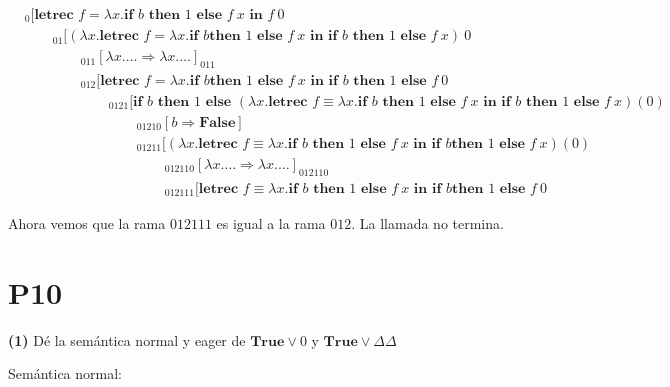 \documentclass[article, 12pt]{article}
\begin{document}
\begin{align*}
&_0[\textbf{letrec } f = \lambda x. 
\textbf{if } b \textbf{ then } 1 \textbf{    else } f ~ x \textbf{ in } f~0 \\ 
&\qquad _{01}[(\lambda x. \textbf{letrec } f = \lambda x.\textbf{if } b \textbf{
then } 1 \textbf{    else } f ~ x \textbf{ in }\textbf{if } b \textbf{ then } 1
\textbf{    else } f ~ x ) ~ 0 \\ 
&\qquad \qquad_{011}[\lambda x. \ldots \Rightarrow \lambda x. \ldots]_{011} \\ 
&\qquad \qquad _{012}[\textbf{letrec } f = \lambda x.\textbf{if } b \textbf{
then } 1 \textbf{    else } f ~ x \textbf{ in } \textbf{if } b \textbf{ then } 1
\textbf{    else } f ~ 0 \\ 
&\qquad\qquad\qquad _{0121}[
\textbf{if } b \textbf{ then } 1 \textbf{    else } 
(\lambda x.\textbf{letrec } f \equiv \lambda x.\textbf{if } b \textbf{ then } 1 \textbf{ else } f ~ x \textbf{ in } \textbf{if } b \textbf{ then } 1 \textbf{    else } f
~ x)(0) \\ 
&\qquad\qquad\qquad\qquad _{01210}[b \Rightarrow \textbf{False}]\\
&\qquad\qquad\qquad\qquad _{01211}[(\lambda x.\textbf{letrec } f \equiv \lambda
x.\textbf{if } b
\textbf{ then } 1 \textbf{ else } f ~ x \textbf{ in } \textbf{if } b \textbf{
then } 1 \textbf{    else } f ~ x) (0)\\ 
&\qquad\qquad\qquad\qquad\qquad _{012110}[\lambda x. \ldots \Rightarrow \lambda
x. \ldots]_{012110}\\
&\qquad\qquad\qquad\qquad\qquad _{012111}[\textbf{letrec } f \equiv \lambda x.\textbf{if } b
\textbf{ then } 1 \textbf{ else } f ~ x \textbf{ in } \textbf{if } b \textbf{
then } 1 \textbf{    else } f ~ 0
\end{align*}

Ahora vemos que la rama $012111$ es igual a la rama $012$. La llamada no
termina.


\pagebreak 

\section{P10}

\begin{myframe}
    \textbf{(1)} Dé la semántica normal y eager de $\textbf{True} \lor 0$ y $\textbf{True}
    \lor \Delta\Delta$
\end{myframe}

Semántica normal:
\end{document}
